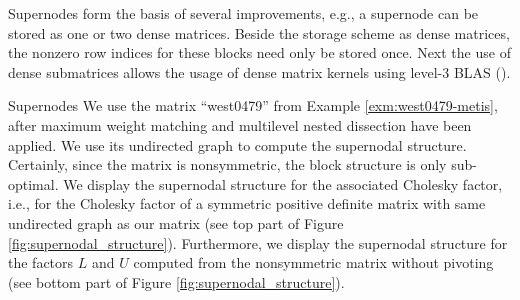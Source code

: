 Supernodes form the basis of several improvements, e.g.,
a supernode can be stored as one or two dense matrices. 
Beside the storage scheme as dense matrices, the nonzero row indices
for these blocks need only be stored once.
Next the use of dense submatrices allows the usage of dense matrix kernels
using level-3 BLAS
(\cite{AndBBDDDGHMOS99}).
\begin{example}{Supernodes}\label{exm:supernodes}
We use the matrix ``west0479'' from Example \ref{exm:west0479-metis},
after maximum weight matching and multilevel nested dissection have
been applied. 
We use its undirected graph to compute the supernodal
structure. Certainly, since the matrix is nonsymmetric, the block structure
is only sub-optimal. We display the supernodal structure for the associated
Cholesky factor, i.e., for the Cholesky factor of a symmetric positive definite
matrix with same undirected graph as our matrix (see
top part of Figure \ref{fig:supernodal_structure}). Furthermore, we display
the supernodal structure for the factors $L$ and $U$ computed from the
nonsymmetric matrix without pivoting (see bottom part of Figure \ref{fig:supernodal_structure}).
\end{example}
